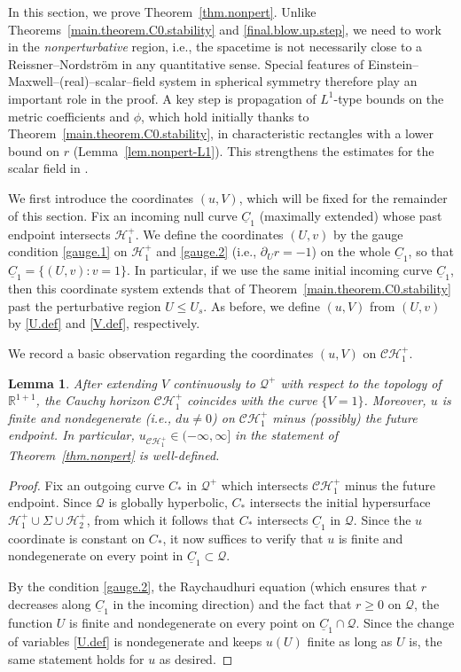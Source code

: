 \documentclass[10pt, reqno]{amsart}
\newtheorem{lemma}[theorem]{Lemma}
\theoremstyle{definition}
\theoremstyle{remark}
\numberwithin{equation}{section}
\newcommand{\set}[1]{\{#1\}}
\newcommand{\rd}{\partial}
\newcommand{\0}{\emptyset}
\newcommand{\Sgm}{\Sigma}
\newcommand{\bbR}{\mathbb R}
\newcommand{\calC}{\mathcal C}
\newcommand{\calH}{\mathcal H}
\newcommand{\calQ}{\mathcal Q}
\newcommand{\uC}{\underline{C}}
\newcommand{\CH}{\calC \calH^{+}}		%
\newcommand{\EH}{\calH^{+}}
\begin{document}
In this section, we prove Theorem~\ref{thm.nonpert}. Unlike Theorems~\ref{main.theorem.C0.stability} and \ref{final.blow.up.step}, we need to work in the \emph{nonperturbative} region, i.e., the spacetime is not necessarily close to a Reissner--Nordstr\"om in any quantitative sense. Special features of Einstein--Maxwell--(real)--scalar--field system in spherical symmetry therefore play an important role in the proof. A key step is propagation of $L^{1}$-type bounds on the metric coefficients and $\phi$, which hold initially thanks to Theorem~\ref{main.theorem.C0.stability}, in characteristic rectangles with a lower bound on $r$ (Lemma~\ref{lem.nonpert-L1}). This strengthens the estimates for the scalar field in \cite[Section~13]{D2}. 


We first introduce the coordinates $(u, V)$, which will be fixed for the remainder of this section.
Fix an incoming null curve $\uC_{1}$ (maximally extended) whose past endpoint intersects $\EH_{1}$. We define the coordinates $(U, v)$ by the gauge condition \eqref{gauge.1} on $\EH_{1}$ and \eqref{gauge.2} (i.e., $\rd_{U} r = -1$) on the whole $\uC_{1}$, so that $\uC_{1} = \set{(U, v) : v = 1}$. In particular, if we use the same initial incoming curve $\uC_{1}$, then this coordinate system extends that of Theorem~\ref{main.theorem.C0.stability} past the perturbative region $U \leq U_{s}$. As before, we define $(u, V)$ from $(U, v)$ by \eqref{U.def} and \eqref{V.def}, respectively. 

We record a basic observation regarding the coordinates $(u, V)$ on $\CH_{1}$.
\begin{lemma} \label{lem.u-reg}
After extending $V$ continuously to $\calQ^{+}$ with respect to the topology of $\bbR^{1+1}$, the Cauchy horizon $\CH_{1}$ coincides with the curve $\set{V = 1}$. Moreover, $u$ is finite and nondegenerate (i.e., $d u \neq 0$) on $\CH_{1}$ minus (possibly) the future endpoint. In particular, $u_{\CH_{1}} \in (-\infty, \infty]$ in the statement of Theorem~\ref{thm.nonpert} is well-defined.
\end{lemma}
 
\begin{proof}
Fix an outgoing curve $C_{\ast}$ in $\calQ^{+}$ which intersects $\CH_{1}$ minus the future endpoint. Since $\calQ$ is globally hyperbolic, $C_{\ast}$ intersects the initial hypersurface $\EH_{1} \cup \Sgm \cup \EH_{2}$, from which it follows that $C_{\ast}$ intersects $\uC_{1}$ in $\calQ$. Since the $u$ coordinate is constant on $C_{\ast}$, it now suffices to verify that $u$ is finite and nondegenerate on every point in $\uC_{1} \subset \calQ$.

By the condition \eqref{gauge.2}, the Raychaudhuri equation (which ensures that $r$ decreases along $\uC_{1}$ in the incoming direction) and the fact that $r \geq 0$ on $\calQ$, the function $U$ is finite and nondegenerate on every point on $\uC_{1} \cap \calQ$. Since the change of variables \eqref{U.def} is nondegenerate and keeps $u(U)$ finite as long as $U$ is, the same statement holds for $u$ as desired. 
\end{proof}
\end{document}
